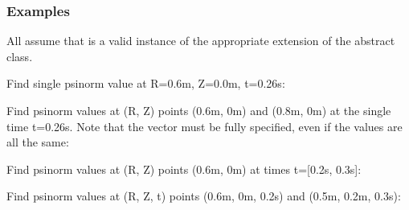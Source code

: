 \documentclass[letterpaper,10pt,english]{sphinxmanual}
\begin{document}
\begin{fulllineitems}
\begin{fulllineitems}
\begin{quote}
\begin{description}
\begin{itemize}
\end{itemize}


\end{description}\end{quote}
\subsubsection*{Examples}

All assume that  is a valid instance of the
appropriate extension of the {\hyperref[\detokenize{eqtools:eqtools.core.Equilibrium}]{}} abstract class.

Find single psinorm value at R=0.6m, Z=0.0m, t=0.26s:

\begin{sphinxVerbatim}[commandchars=\\\{\}]
    
\end{sphinxVerbatim}

Find psinorm values at (R, Z) points (0.6m, 0m) and (0.8m, 0m) at the
single time t=0.26s. Note that the  vector must be fully specified,
even if the values are all the same:

\begin{sphinxVerbatim}[commandchars=\\\{\}]
  \PYG{p}{[} \PYG{p}{]} \PYG{p}{[} \PYG{p}{]} 
\end{sphinxVerbatim}

Find psinorm values at (R, Z) points (0.6m, 0m) at times t={[}0.2s, 0.3s{]}:

\begin{sphinxVerbatim}[commandchars=\\\{\}]
    \PYG{p}{[} \PYG{p}{]}
\end{sphinxVerbatim}

Find psinorm values at (R, Z, t) points (0.6m, 0m, 0.2s) and (0.5m, 0.2m, 0.3s):


\end{fulllineitems}
\end{fulllineitems}
\end{document}
